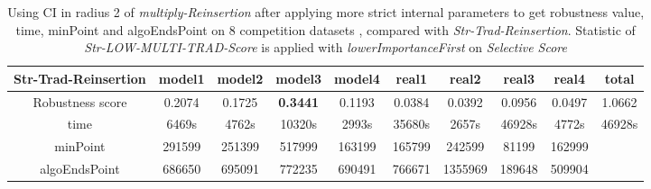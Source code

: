 \documentclass{article}
\begin{document}
		\begin{table}[!htbp]
		\begin{adjustwidth}{-3cm}{}		
		\begin{threeparttable}		
			\centering
			\caption{Using CI in radius 2 of \textit{multiply-Reinsertion} after applying more strict internal parameters to get robustness value, time, minPoint and algoEndsPoint on 8 competition datasets , compared with \textit{Str-Trad-Reinsertion}. Statistic of \textit{Str-LOW-MULTI-TRAD-Score} is applied with \textit{lowerImportanceFirst} on \textit{Selective Score} }
			\label{tab:table14}
			\begin{tabular}{|c|c|c|c|c|c|c|c|c|c|}
				\hline		
				
				
				\textbf{Str-Trad-Reinsertion} & \textbf{model1} & \textbf{model2} & \textbf{model3} & \textbf{model4} & \textbf{real1} & \textbf{real2} & \textbf{real3} & \textbf{real4} & \textbf{total} \\ \hline
				Robustness score                 & 0.2074          & 0.1725          & \textbf{0.3441}          & 0.1193          & 0.0384         & 0.0392         & 0.0956         & 0.0497         & 1.0662         \\ \hline
				time                             & 6469s           & 4762s           & 10320s          & 2993s           & 35680s         & 2657s          & 46928s         & 4772s          & 46928s         \\ \hline
				minPoint                         & 291599          & 251399          & 517999          & 163199          & 165799         & 242599         & 81199          & 162999         &                \\ \hline
				algoEndsPoint                    & 686650          & 695091          & 772235          & 690491          & 766671         & 1355969        & 189648         & 509904         &                \\ \hline
				

\end{tabular}
\end{threeparttable}
\end{adjustwidth}
\end{table}
\end{document}
